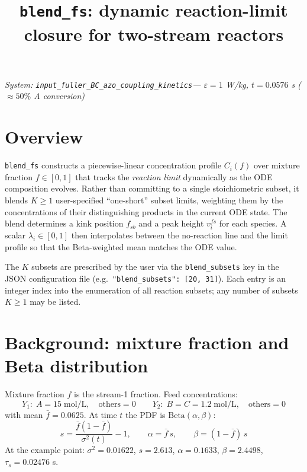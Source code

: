 \documentclass[11pt]{article}
\title{\vspace{-1.5em}\textbf{\large \texttt{blend\_fs}: dynamic reaction-limit closure
for two-stream reactors}}
\author{}
\date{}
\newcommand{\fsb}{f_{sb}}
\begin{document}
\maketitle
\vspace{-2em}
\begin{center}
\small\itshape
System: \texttt{input\_fuller\_BC\_azo\_coupling\_kinetics}\quad---\quad
$\varepsilon = 1$ W/kg, $t = 0.0576$ s (${\approx}50\%$ A conversion)
\end{center}

\section{Overview}

\texttt{blend\_fs} constructs a piecewise-linear concentration profile $C_i(f)$ over
mixture fraction $f\in[0,1]$ that tracks the \emph{reaction limit} dynamically as the
ODE composition evolves.  Rather than committing to a single stoichiometric subset, it
blends $K\geq 1$ user-specified ``one-short'' subset limits, weighting them by the
concentrations of their distinguishing products in the current ODE state.  The blend
determines a kink position $\fsb$ and a peak height $v^{fs}_i$ for each species.  A
scalar $\lambda_i\in[0,1]$ then interpolates between the no-reaction line and the limit
profile so that the Beta-weighted mean matches the ODE value.

The $K$ subsets are prescribed by the user via the \texttt{blend\_subsets} key in the
JSON configuration file (e.g.\ \texttt{"blend\_subsets": [20, 31]}).  Each entry is an
integer index into the enumeration of all reaction subsets; any number of subsets
$K\geq 1$ may be listed.

\section{Background: mixture fraction and Beta distribution}

Mixture fraction $f$ is the stream-1 fraction.  Feed concentrations:
\[
  Y_1:\; A = 15\;\text{mol/L},\quad \text{others} = 0
  \qquad
  Y_2:\; B = C = 1.2\;\text{mol/L},\quad \text{others} = 0
\]
with mean $\bar{f} = 0.0625$.  At time $t$ the PDF is $\mathrm{Beta}(\alpha,\beta)$:
\begin{equation}
  s = \frac{\bar{f}(1-\bar{f})}{\sigma^2(t)} - 1,
  \qquad
  \alpha = \bar{f}\,s,
  \qquad
  \beta = (1-\bar{f})\,s
  \label{eq:beta-params}
\end{equation}
At the example point: $\sigma^2 = 0.01622$, $s = 2.613$, $\alpha = 0.1633$,
$\beta = 2.4498$, $\tau_s = 0.02476$ s.
\end{document}
